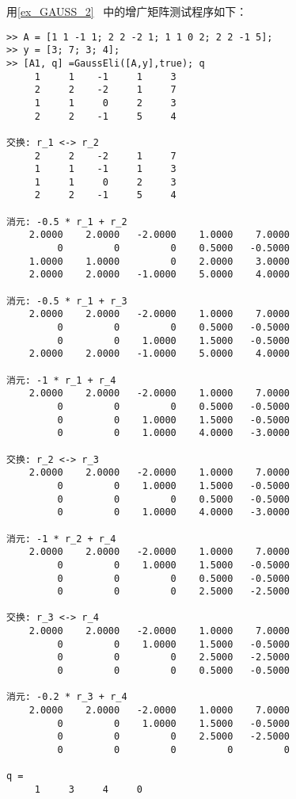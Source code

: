 用\autoref{ex_GAUSS_2}~ 中的增广矩阵测试程序如下：
\begin{lstlisting}[language=matlabC]
>> A = [1 1 -1 1; 2 2 -2 1; 1 1 0 2; 2 2 -1 5];
>> y = [3; 7; 3; 4];
>> [A1, q] =GaussEli([A,y],true); q
     1     1    -1     1     3
     2     2    -2     1     7
     1     1     0     2     3
     2     2    -1     5     4

交换: r_1 <-> r_2
     2     2    -2     1     7
     1     1    -1     1     3
     1     1     0     2     3
     2     2    -1     5     4

消元: -0.5 * r_1 + r_2
    2.0000    2.0000   -2.0000    1.0000    7.0000
         0         0         0    0.5000   -0.5000
    1.0000    1.0000         0    2.0000    3.0000
    2.0000    2.0000   -1.0000    5.0000    4.0000

消元: -0.5 * r_1 + r_3
    2.0000    2.0000   -2.0000    1.0000    7.0000
         0         0         0    0.5000   -0.5000
         0         0    1.0000    1.5000   -0.5000
    2.0000    2.0000   -1.0000    5.0000    4.0000

消元: -1 * r_1 + r_4
    2.0000    2.0000   -2.0000    1.0000    7.0000
         0         0         0    0.5000   -0.5000
         0         0    1.0000    1.5000   -0.5000
         0         0    1.0000    4.0000   -3.0000

交换: r_2 <-> r_3
    2.0000    2.0000   -2.0000    1.0000    7.0000
         0         0    1.0000    1.5000   -0.5000
         0         0         0    0.5000   -0.5000
         0         0    1.0000    4.0000   -3.0000

消元: -1 * r_2 + r_4
    2.0000    2.0000   -2.0000    1.0000    7.0000
         0         0    1.0000    1.5000   -0.5000
         0         0         0    0.5000   -0.5000
         0         0         0    2.5000   -2.5000

交换: r_3 <-> r_4
    2.0000    2.0000   -2.0000    1.0000    7.0000
         0         0    1.0000    1.5000   -0.5000
         0         0         0    2.5000   -2.5000
         0         0         0    0.5000   -0.5000

消元: -0.2 * r_3 + r_4
    2.0000    2.0000   -2.0000    1.0000    7.0000
         0         0    1.0000    1.5000   -0.5000
         0         0         0    2.5000   -2.5000
         0         0         0         0         0
         
q =
     1     3     4     0
\end{lstlisting}
